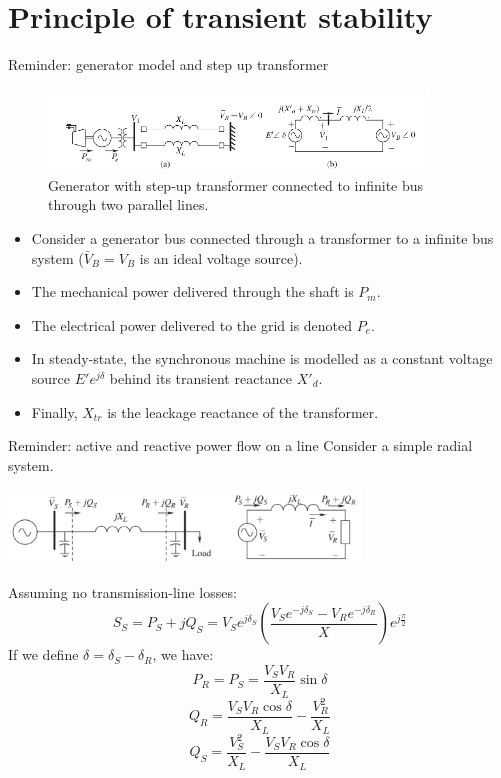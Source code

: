 \section{Principle of transient stability}
\begin{frame}[allowframebreaks]{Reminder: generator model and step up transformer}
    \begin{figure}
        \centering
        \includegraphics[width=0.9\textwidth]{images/Principle_TS.png}
        \caption{Generator with step-up transformer connected to infinite bus through two parallel lines.}
        \label{fig:OMIB}
    \end{figure}
\begin{itemize}
    \item Consider a generator bus connected through a transformer to a infinite bus system ($\bar{V}_B = V_B$ is an ideal voltage source).
    \item The mechanical power delivered through the shaft is $P_m$.
    \item The electrical power delivered to the grid is denoted $P_e$.
    \item In steady-state, the synchronous machine is modelled as a constant voltage source $E' e^{j\delta}$ behind its transient reactance $X'_d$.
    \item Finally, $X_{tr}$ is the leackage reactance of the transformer.
\end{itemize}
\end{frame}

\begin{frame}[allowframebreaks]{Reminder: active and reactive power flow on a line}
Consider a simple radial system.
\begin{center}
\includegraphics[width=0.7\textwidth]{images/RadialSystem.png}
\end{center}
Assuming no transmission-line losses:
$$S_S = P_S + jQ_S = V_S e^{j \delta_S} \left(\frac{V_S e^{-j \delta_S} - V_R e^{-j \delta_R}}{X}\right) e^{j\frac{\pi}{2}}$$
If we define $\delta = \delta_S-\delta_R$, we have:
$$P_R = P_S = \frac{V_S V_R}{X_L}\sin \delta$$
$$Q_{R} = \frac{V_S V_R \cos \delta}{X_L} - \frac{V^2_R}{X_L}$$
$$Q_{S} = \frac{V_S^2}{X_L} - \frac{V_S V_R \cos \delta}{X_L}$$
\end{frame}

